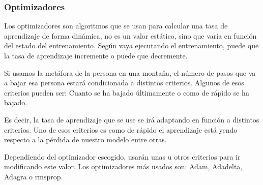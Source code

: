 \subsubsection{Optimizadores}
Los optimizadores son algoritmos que se usan para calcular una tasa de aprendizaje de forma dinámica, no es un valor estático, sino que varía en función del estado del entrenamiento. Según vaya ejecutando el entrenamiento, puede que la tasa de aprendizaje incremente o puede que decremente.
\newline

Si usamos la metáfora de la persona en una montaña, el número de pasos que va a bajar esa persona estará condicionada a distintos criterios. Algunos de esos criterios pueden ser: Cuanto se ha bajado últimamente o como de rápido se ha bajado. 
\newline

Es decir, la tasa de aprendizaje que se use se irá adaptando en función a distintos criterios. Uno de esos criterios es como de rápido el aprendizaje está yendo respecto a la pérdida de nuestro modelo entre otras.
\newline



Dependiendo del optimizador escogido, usarán unas u otros criterios para ir modificando este valor.  Los optimizadores más usados son: Adam\cite{kingma}, Adadelta\cite{zeiler}, Adagra\cite{duchi} o \acrshort{rmsprop}\cite{duchi}.
\newline